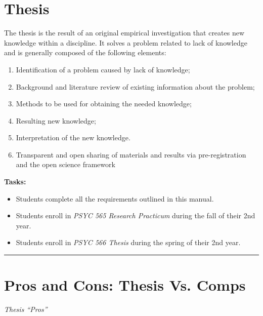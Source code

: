 \documentclass[openany]{book}
\providecommand{\tightlist}{%
  \setlength{\itemsep}{0pt}\setlength{\parskip}{0pt}}
\begin{document}
\hypertarget{thesis}{%
\section{Thesis}\label{thesis}}

The thesis is the result of an original empirical investigation that creates new knowledge within a discipline. It solves a problem related to lack of knowledge and is generally composed of the following elements:

\begin{enumerate}
\def\labelenumi{\arabic{enumi}.}
\tightlist
\item
  Identification of a problem caused by lack of knowledge;
\item
  Background and literature review of existing information about the problem;
\item
  Methods to be used for obtaining the needed knowledge;
\item
  Resulting new knowledge;
\item
  Interpretation of the new knowledge.
\item
  Transparent and open sharing of materials and results via pre-registration and the open science framework
\end{enumerate}

\textbf{Tasks:}

\begin{itemize}
\tightlist
\item
  Students complete all the requirements outlined in this manual.
\item
  Students enroll in \emph{PSYC 565 Research Practicum} during the fall of their 2nd year.
\item
  Students enroll in \emph{PSYC 566 Thesis} during the spring of their 2nd year.
\end{itemize}

\begin{center}\rule{0.5\linewidth}{0.5pt}\end{center}

\hypertarget{pros-and-cons-thesis-vs.-comps}{%
\section{Pros and Cons: Thesis Vs. Comps}\label{pros-and-cons-thesis-vs.-comps}}

\emph{Thesis ``Pros''}
\end{document}

